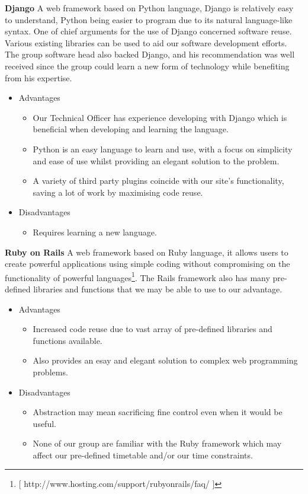\documentclass[12pt]{article}
\begin{document}
\textbf{Django}
\newline
\newline
A web framework based on Python language, Django is relatively easy to understand, Python being easier to program due to its natural language-like syntax. One of chief arguments for the use of Django concerned software reuse. Various existing libraries can be used to aid our software development efforts. The group software head also backed Django, and his recommendation was well received since the group could learn a new form of technology while benefiting from his expertise.
\begin{itemize}
\item Advantages
	\begin{itemize}
	\item Our Technical Officer has experience developing with Django which is beneficial when developing and learning the language.
	\item Python is an easy language to learn and use, with a focus on simplicity and ease of use whilst providing an elegant solution to the problem.
	\item A variety of third party plugins coincide with our site's functionality, saving a lot of work by maximising code 	        reuse.
	\end{itemize}
\item Disadvantages
	\begin{itemize}
	\item Requires learning a new language.
	\end{itemize}
\end{itemize}
\textbf{Ruby on Rails}
\newline
\newline
A web framework based on Ruby language, it allows users to create powerful applications using simple coding without compromising on the functionality of powerful languages\footnote{[ http://www.hosting.com/support/rubyonrails/faq/ ]}. The Rails framework also has many pre-defined libraries and functions that we may be able to use to our advantage.
\begin{itemize}
\item Advantages
	\begin{itemize}
	\item Increased code reuse due to vast array of pre-defined libraries and functions available.
	\item Also provides an esay and elegant solution to complex web programming problems.
	\end {itemize}
\item Disadvantages
	\begin{itemize}
	\item Abstraction may mean sacrificing fine control even when it would be useful.
	\item None of our group are familiar with the Ruby framework which may affect our pre-defined timetable and/or our time constraints.
	\end {itemize}
\end {itemize}
\end{document}
